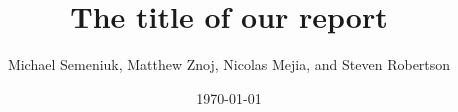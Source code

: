 \title{The title of our report}
\author{Michael Semeniuk, Matthew Znoj, Nicolas Mejia, and Steven Robertson}
\date{\today}

\maketitle

